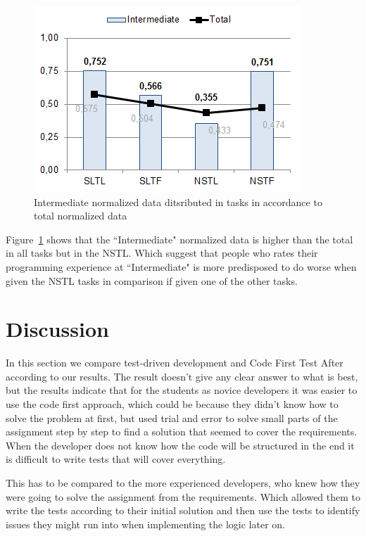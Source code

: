 \documentclass{sig-alternate-05-2015}
\begin{document}
\begin{figure}[!ht]
	\centering
	\includegraphics[width=1\linewidth]{img12}
	\caption{Intermediate normalized data ditsributed in tasks in accordance to total normalized data}
	\label{fig:Intermediate normalized data ditsributed in tasks in accordance to total normalized data}
\end{figure}

Figure~\ref{fig:Intermediate normalized data ditsributed in tasks in accordance to total normalized data} shows that the ``Intermediate" normalized data is higher than the total in all tasks but in the NSTL. Which suggest that people who rates their programming experience at ``Intermediate" is more predisposed to do worse when given the NSTL tasks in comparison if given one of the other tasks.


\section{Discussion}
\label{sec:Discussion}
In this section we compare test-driven development and Code First Test After according to our results. The result doesn't give any clear answer to what is best, but the results indicate that for the students as novice developers it was easier to use the code first approach, which could be because they didn't know how to solve the problem at first, but used trial and error to solve small parts of the assignment step by step to find a solution that seemed to cover the requirements. When the developer does not know how the code will be structured in the end it is difficult to write tests that will cover everything.

This has to be compared to the more experienced developers, who knew how they were going to solve the assignment from the requirements. Which allowed them to write the tests according to their initial solution and then use the tests to identify issues they might run into when implementing the logic later on.
\end{document}
